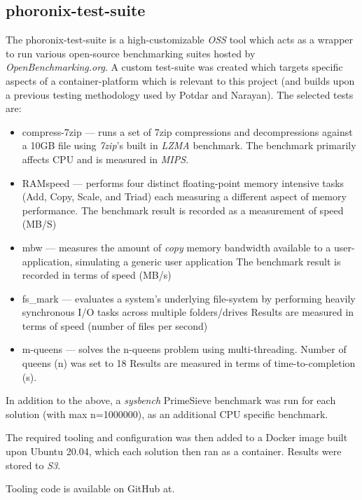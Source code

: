 \subsection{phoronix-test-suite}
The phoronix-test-suite is a high-customizable \emph{OSS} tool which acts as a wrapper to run various open-source benchmarking suites hosted by \emph{OpenBenchmarking.org}\cite{openbenchmarking.org_2020}.
A custom test-suite was created which targets specific aspects of a container-platform which is relevant to this project (and builds upon a previous testing methodology used by Potdar and Narayan\cite{POTDAR20201419}).
The selected tests are:
\begin{itemize}
  \item compress-7zip\cite{7zip_lzma_benchmark} --- runs a set of 7zip compressions and decompressions against a 10GB file using \emph{7zip}'s built in \emph{LZMA} benchmark.
        The benchmark primarily affects CPU and is measured in \emph{MIPS}.
  \item RAMspeed\cite{hollander_bolotoff_2002} --- performs four distinct floating-point memory intensive tasks (Add, Copy, Scale, and Triad) each measuring a different aspect of memory performance.
        The benchmark result is recorded as a measurement of speed (MB/S)
  \item mbw\cite{raas_2022} --- measures the amount of \textit{copy} memory bandwidth available to a user-application, simulating a generic user application 
        The benchmark result is recorded in terms of speed (MB/s)
  \item fs\_mark\cite{josefbacik_2014} --- evaluates a system's underlying file-system by performing heavily synchronous I/O tasks across multiple folders/drives
        Results are measured in terms of speed (number of files per second)
  \item m-queens\cite{sudden6_2014} --- solves the n-queens\cite{sloman_quanta} problem using multi-threading. Number of queens (n) was set to 18
        Results are measured in terms of time-to-completion (s).
\end{itemize}
In addition to the above, a \emph{sysbench}\cite{akopytov_2020} PrimeSieve benchmark was run for each solution (with max n=1000000), as an additional CPU specific benchmark.


The required tooling and configuration was then added to a Docker image built upon Ubuntu 20.04\cite{ubuntu_wiki}, which each solution then ran as a container.
Results were stored to \emph{S3}.

Tooling code is available on GitHub at\cite{tool_benchmarking_suite}.

